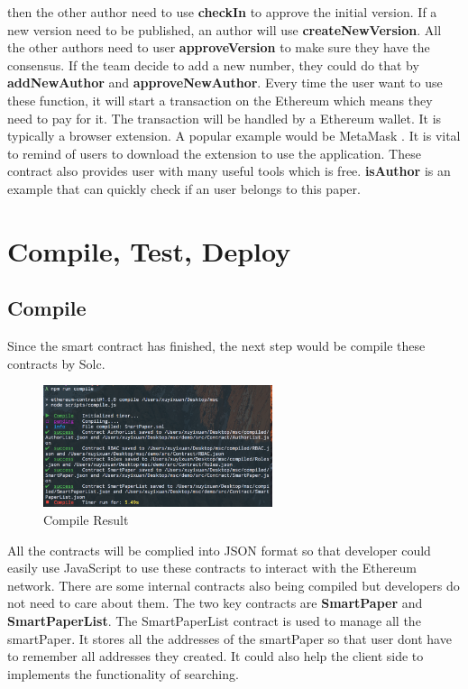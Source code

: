 \documentclass{ecsthesis}      %
\begin{document}
then the other author need to use \textbf{checkIn} to approve the initial version.
If a new version need to be published, an author will use \textbf{createNewVersion}. 
All the other authors need to user \textbf{approveVersion} to make sure they have the consensus.
If the team decide to add a new number, they could do that by \textbf{addNewAuthor} and \textbf{approveNewAuthor}.
Every time the user want to use these function, 
it will start a transaction on the Ethereum which means they need to pay for it.
The transaction will be handled by a Ethereum wallet. It is typically a browser extension. 
A popular example would be MetaMask \cite{metamask}. 
It is vital to remind of users to download the extension to use the application.
These contract also provides user with many useful tools which is free. 
\textbf{isAuthor} is an example that can quickly check if an user belongs to this paper.
\section{Compile, Test, Deploy}
\subsection{Compile}
Since the smart contract has finished, the next step would be compile these contracts by Solc.
\begin{figure}[H]
  \centering
  \includegraphics[width=0.6\textwidth]{compile.png}
  \caption{Compile Result}
  \label{compile} 
\end{figure}
All the contracts will be complied into JSON format so that developer could easily use JavaScript to use these contracts to interact with the Ethereum network.
There are some internal contracts also being compiled but developers do not need to care about them. The two key contracts are \textbf{SmartPaper} and \textbf{SmartPaperList}.
The SmartPaperList contract is used to manage all the smartPaper. 
It stores all the addresses of the smartPaper so that user dont have to remember all addresses they created.
It could also help the client side to implements the functionality of searching.
\end{document}
